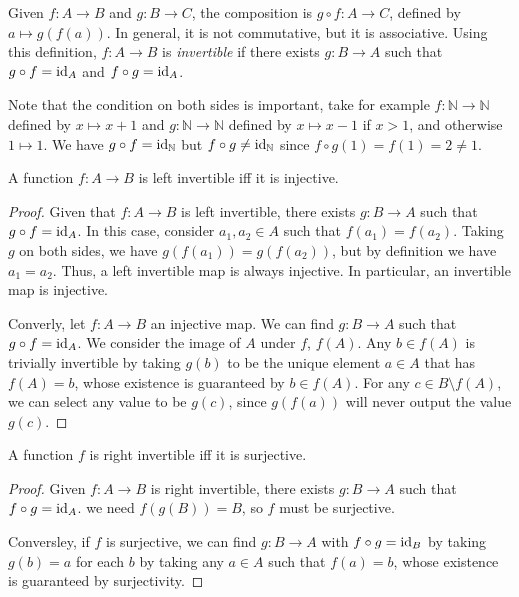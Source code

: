 \documentclass[12pt]{article}
\begin{document}
Given $f: A \to B$ and $g : B \to C$,
the composition is $g \circ f: A \to C$, defined by
$a \mapsto g(f(a))$.
In general, it is not commutative,
but it is associative.
Using this definition, $f: A\to B$ is \emph{invertible}
if there exists $g : B \to A$ such that $g \circ f = \operatorname{id}_{A}$ and $f \circ g = \operatorname{id}_{A}$.

Note that the condition on both sides is important,
take for example $f : \mathbb{N} \to \mathbb{N}$ defined by $x \mapsto x+1$
and $g : \mathbb{N} \to \mathbb{N}$ defined by $x \mapsto x-1$ if $x > 1$, and otherwise $1 \mapsto 1$.
We have $g \circ f = \operatorname{id}_{\mathbb{N}}$ but $f \circ g \ne \operatorname{id}_{\mathbb{N}}$
since $f \circ g(1) = f(1) = 2 \ne 1$.

\begin{lemma}
    A function $f : A \to B$ is left invertible
    iff it is injective.
\end{lemma}

\begin{proof}
    Given that $f : A \to B$ is left invertible,
    there exists $g : B \to A$ such that $g \circ f = \operatorname{id}_{A}$.
    In this case, consider $a_{1},a_{2} \in A$ such that $f(a_{1}) = f(a_{2})$.
    Taking $g$ on both sides, we have $g(f(a_{1})) = g(f(a_{2}))$,
    but by definition we have $a_{1} = a_{2}$.
    Thus, a left invertible map is always injective.
    In particular, an invertible map is injective.

    Converly, let $f : A \to B$ an injective map.
    We can find $g : B \to A$ such that $g \circ f = \operatorname{id}_{A}$.
    We consider the image of $A$ under $f$, $f(A)$.
    Any $b \in f(A)$ is trivially invertible
    by taking $g(b)$ to be the unique element $a \in A$
    that has $f(A) = b$, whose existence is guaranteed by $b \in f(A)$.
    For any $c \in B \setminus f(A)$, we can select any value to be $g(c)$,
    since $g(f(a))$ will never output the value $g(c)$.
\end{proof}

\begin{lemma}
    A function $f$ is right invertible iff 
    it is surjective.
\end{lemma}

\begin{proof}
    Given $f: A \to B$ is right invertible,
    there exists $g : B \to A$ such that $f \circ g = \operatorname{id}_{A}$.
    we need $f(g(B)) = B$, so $f$ must be surjective.

    Conversley, if $f$ is surjective, we can find $g : B \to A$
    with $f \circ g = \operatorname{id}_{B}$ by taking $g(b) = a$
    for each $b$ by taking any $a \in A$ such that $f(a) = b$,
    whose existence is guaranteed by surjectivity.
\end{proof}
\end{document}
